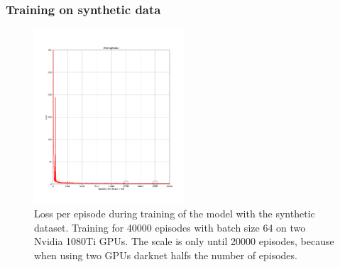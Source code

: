 \subsubsection{Training on synthetic data}
\begin{figure}[t]
\includegraphics[width=0.5\textwidth]{figures/loss.png}
\caption{Loss per episode during training of the model with the synthetic dataset. Training for 40000 episodes with batch size 64 on two Nvidia 1080Ti GPUs. The scale is only until 20000 episodes, because when using two GPUs darknet halfs the number of episodes.}
\label{fig:loss}
\end{figure}
